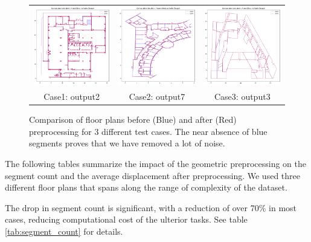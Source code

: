 \documentclass[11pt]{article}
\begin{document}
\begin{figure}[h]
    \centering
    \begin{tabular}{ccc}
        \includegraphics[width=0.32\linewidth]{figures/avant_apres_pretraitement2.png}
        &
        \includegraphics[width=0.32\linewidth]{figures/avant_apres_pretraitement7.png}
        &
        \includegraphics[width=0.32\linewidth]{figures/avant_apres_pretraitement3.png}
        \\
        Case1: output2 & Case2: output7 & Case3: output3 
    \end{tabular}

    \caption{Comparison of floor plans before (Blue) and after (Red) preprocessing 
    for 3 different test cases. The near absence of blue segments proves that
    we have removed a lot of noise.}
    \label{fig:geojson_comparison}
\end{figure}
The following tables summarize the impact of the geometric preprocessing on the
segment count and the average displacement after preprocessing. We used three 
different floor plans that spans along the range of complexity of the dataset.

The drop in segment count is significant, with a reduction of over 70\% in most cases, 
reducing computational cost of the ulterior tasks. See table \ref{tab:segment_count} for details.
\end{document}
